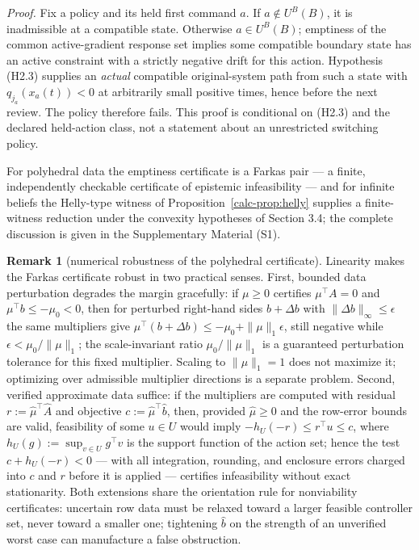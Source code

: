 \documentclass[10pt,twocolumn]{article}
\theoremstyle{definition}
\newtheorem{remark}{Remark}
\begin{document}
\emph{Proof.} Fix a policy and its held first command \(a\). If \(a\notin U^B(B)\), it is inadmissible at a compatible state. Otherwise \(a\in U^B(B)\); emptiness of the common active-gradient response set implies some compatible boundary state has an active constraint with a strictly negative drift for this action. Hypothesis (H2.3) supplies an \emph{actual} compatible original-system path from such a state with \(q_{j_a}(x_a(t))<0\) at arbitrarily small positive times, hence before the next review. The policy therefore fails. This proof is conditional on (H2.3) and the declared held-action class, not a statement about an unrestricted switching policy.

For polyhedral data the emptiness certificate is a Farkas pair --- a finite, independently checkable certificate of epistemic infeasibility --- and for infinite beliefs the Helly-type witness of Proposition~\ref{calc-prop:helly} supplies a finite-witness reduction under the convexity hypotheses of Section 3.4; the complete discussion is given in the Supplementary Material (S1).

\begin{remark}[numerical robustness of the polyhedral certificate]\label{calc-rem:robust-farkas}
Linearity makes the Farkas certificate robust in two practical senses. First,
bounded data perturbation degrades the margin gracefully: if
\(\mu \ge 0\) certifies \(\mu^{\top} A = 0\) and \(\mu^{\top} b \le -\mu_0 < 0\),
then for perturbed right-hand sides \(b + \Delta b\) with
\(\|\Delta b\|_\infty \le \epsilon\) the same multipliers give
\(\mu^{\top}(b + \Delta b) \le -\mu_0 + \|\mu\|_1 \epsilon\), still negative
while \(\epsilon < \mu_0/\|\mu\|_1\); the scale-invariant ratio \(\mu_0/\|\mu\|_1\) is a guaranteed perturbation tolerance for this fixed multiplier. Scaling to \(\|\mu\|_1=1\) does not maximize it; optimizing over admissible multiplier directions is a separate problem. Second, verified approximate data suffice: if the
multipliers are computed with residual \(r := \hat\mu^{\top} \hat A\) and
objective \(c := \hat\mu^{\top} \hat b\), then, provided \(\hat\mu\ge0\) and the row-error bounds are valid, feasibility of some
\(u \in U\) would imply \(-h_U(-r) \le r^{\top} u \le c\), where
\(h_U(g) := \sup_{v \in U} g^{\top} v\) is the support function of the action
set; hence the test \(c + h_U(-r) < 0\) --- with all integration, rounding,
and enclosure errors charged into \(c\) and \(r\) before it is applied ---
certifies infeasibility without exact stationarity. Both extensions share the
orientation rule for nonviability certificates: uncertain row data must be
relaxed toward a larger feasible controller set, never toward a smaller one;
tightening \(\hat b\) on the strength of an unverified worst case can
manufacture a false obstruction.
\end{remark}
\end{document}

